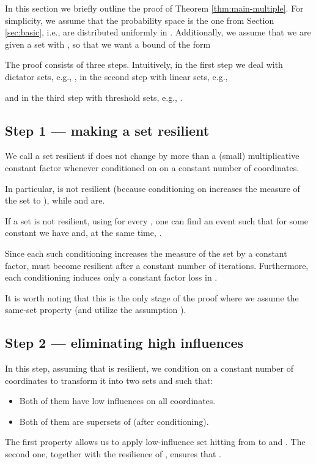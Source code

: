 \documentclass{daj}
\newcommand{\1}{\mathbbm{1}}
\theoremstyle{plain}
\theoremstyle{definition}
\begin{document}
In this section we briefly outline the proof of Theorem \ref{thm:main-multiple}. 
For simplicity, we assume that the probability space is the one from 
Section \ref{sec:basic}, i.e.,
 are distributed uniformly in .
Additionally, we assume that we are given a set 
with , so that we want a bound of the form


The proof consists of three steps.
Intuitively, in the first step we deal with dictator sets, e.g.,
,
in the second step with linear sets, e.g.,

and in the third step with threshold sets, e.g.,
.

\subsection{Step 1 --- making a set resilient}

We call a set resilient if  does not change by more
than a (small) multiplicative constant factor whenever conditioned on 
 on a constant number  of 
coordinates.

In particular,  is not resilient (because
conditioning on  increases the measure of the set to ), 
while  and  are.

If a set is not resilient, using  for every 
,
one can find an event 
such that for some constant  we have
 and, at the same time,
 .

Since each such conditioning increases the measure of the set  by a constant 
factor,  must become resilient after a constant number of iterations.
Furthermore,
each conditioning induces only a constant factor loss in
.

It is worth noting that this is the only stage of the proof where
we assume the same-set property (and utilize the assumption
).

\subsection{Step 2 --- eliminating high influences}

In this step, assuming that  is resilient, we condition on a constant
number of coordinates to transform it into two
sets  and  such that:
\begin{itemize}
\item Both of them have low influences on all coordinates.
\item Both of them are supersets of  (after conditioning).
\end{itemize}

The first property allows us to apply low-influence set hitting 
from  to
 and . The second one, together with the resilience of , 
ensures that .
\end{document}
